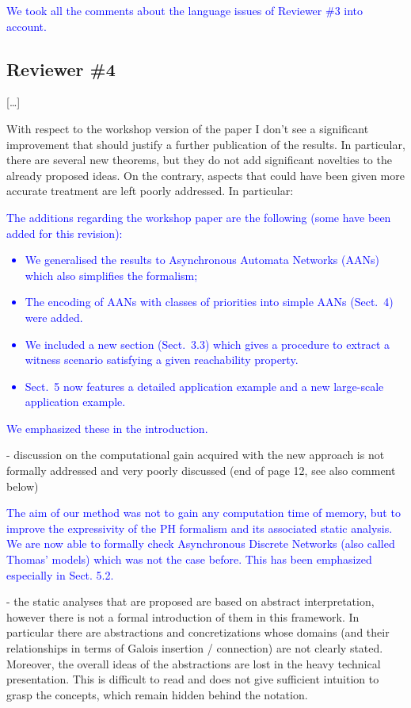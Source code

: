 \documentclass[11pt]{article}
\newcommand{\answer}[1]{\textcolor{blue}{#1}\vspace*{1em}}
\begin{document}
\answer{
We took all the comments about the language issues of Reviewer \#3 into account.
}



\subsection*{Reviewer \#4}

[…]

With respect to the workshop version of the paper I don't see a significant improvement that should justify a further publication of the results. In particular, there are several new theorems, but they do not add significant novelties to the already proposed ideas. On the contrary, aspects that could have been given more accurate treatment are left poorly addressed. In particular:

\answer{
The additions regarding the workshop paper are the following
(some have been added for this revision):
\begin{itemize}
  \item We generalised the results to Asynchronous Automata
    Networks (AANs) which also simplifies the formalism;
  \item The encoding of AANs with classes of priorities into simple AANs
    (Sect.~4) were added.
  \item We included a new section (Sect.~3.3)
    which gives a procedure to extract a witness scenario
    satisfying a given reachability property.
  \item Sect.~5 now features a detailed application example
    and a new large-scale application example.
\end{itemize}
We emphasized these in the introduction.
}

- discussion on the computational gain acquired with the new approach is not formally addressed and very poorly discussed (end of page 12, see also comment below)

\answer{
The aim of our method was not to gain any computation time of memory,
but to improve the expressivity of the PH formalism and its associated static analysis.
We are now able to formally check Asynchronous Discrete Networks
(also called Thomas' models)
which was not the case before.
This has been emphasized especially in Sect. 5.2.
}

- the static analyses that are proposed are based on abstract interpretation, however there is not a formal introduction of them in this framework. In particular there are abstractions and concretizations whose domains (and their relationships in terms of Galois insertion / connection) are not clearly stated. Moreover, the overall ideas of the abstractions are lost in the heavy technical presentation. This is difficult to read and does not give sufficient intuition to grasp the concepts, which remain hidden behind the notation. 
\end{document}
